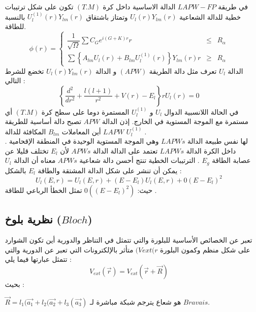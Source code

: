 في طريقة $ LAPW-FP  $ الدالة الاساسية داخل كرة $ (T.M) $ تكون على شكل ترتيبات خطية للدالة الشعاعية $  U_{l} (r) Y_{lm} (r) $ وتمتاز باشتقاق $  U_{l}^{(1)} (r) Y_{lm} (r) $ بالنسبة للطاقة.
\begin{equation}\label{key}
	\phi(r) = \left\{\begin{array}{rcl} 
		\dfrac{1}{\sqrt\Omega} \sum C_{G} e^{i(G+K)r}    r & \leq & R_{\alpha}\\
		\sum \left\{A_{lm} U_{l}(r) + B_{lm} U_{l}^{(1)} (r)  \right\} Y_{lm} (r)    r & \geq & R_{\alpha}
	\end{array} \right.
\end{equation}
الدالة $ U_{l} $ تعرف مثل دالة الطريقة $ ( APW ) $ و الدالة $  U_{l} (r) Y_{lm} (r) $ تخضع للشرط التالي :
\begin{equation}\label{}
	\left\{\frac{d^{2}}{dr^{2}} + \dfrac{l(l+1)}{r^{2}} + V(r) - E_{l} \right\} r U_{l} (r) = 0 
\end{equation}
في الحالة اللانسبية الدوال $ U_{l} $ و $ U_{l}^{(1)} $ المستمرة دوما على سطح كرة $ (T.M) $ أي مستمرة مع الموجة المستوية في الخارج. إذن  الدالة $ APW  $ تصبح دالة أساسية للطريقة  $ LAPW $ أين المعاملات $ B_{lm} $ المكافئة للدالة $ U_{l}^{(1)} $ .\\
لها نفس طبيعة الدالة $ LAPWs  $ وهي الموجة المستوية الوحيدة في المنطقة الإقحامية . داخل الكرة الدالة $ LAPWs $ تعتمد على الدالة الدالة $ APWs  $ لأن  $ E_{l} $ تختلف قليلا عن عصابة الطاقة $ E_{g} $ . الترتيبات الخطية تنتج أحسن دالة شعاعية $ APWs $ معناه أن الدالة $ U_{l} $ يمكن أن تنشر على شكل الدالة المشتقة والطاقة $ E_{l} $ بالشكل :
\begin{equation}\label{}
	U_{l}(E,r) = U_{l}(E,r) + (E - E_{l}) U_{l} (E,r) + 0 (E - E_{l})^{2}
\end{equation}
حيث: $ 0((E - E_{l})^{2}) $ تمثل الخطأ الرباعي للطاقة . \cite{b5}

\subsection{ نظرية بلوخ ($ Bloch $) }
تعبر عن الخصائص الأساسية للبلورة والتي تتمثل في التناظر والدورية أين تكون الشوارد على شكل منظم وكمون البلورة $ (Vext(r $ متأثر بالإلكترونات التي تعبر عن الدورية والتي تتمثل عبارتها فيما يلي : 
\begin{equation}\label{key}
	 V_{ext}(\vec{r}) = V_{ext}(\vec{r} + \vec{R}) 
\end{equation}
بحيث :

	$ \vec{R} = l_{1}(\vec{a_{1}} + l_{2}(\vec{a_{2}} + l_{3}(\vec{a_{3}} )  $  هو شعاع يترجم شبكة مباشرة لـ $ Bravais $.\\


